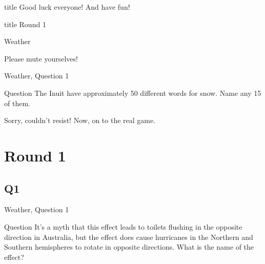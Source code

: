 \documentclass[11pt]{beamer}
\begin{document}
\begingroup{}
\begin{frame}
\vfill{}
\begin{beamercolorbox}[sep=8pt,center,shadow=true,rounded=true]{title}
Good luck everyone! And have fun!
\end{beamercolorbox}
\vfill{}
\end{frame}
\endgroup{}


\begin{frame}
\vfill
\centering
\begin{beamercolorbox}[sep=8pt,center,shadow=true,rounded=true]{title}
Round 1\par%
Weather\par%
\end{beamercolorbox}
\begin{center}
Please mute yourselves!
\end{center}
\vfill
\end{frame}

\begin{frame}[t]{Weather, Question 1}

\begin{block}{Question}
The Inuit have approximately 50 different words for snow. Name any 15 of them.
\end{block}
\pause{}
\begin{block}{}
Sorry, couldn't resist! Now, on to the real game.
\end{block}
\end{frame}
\def\thisSectionName{Weather}
\section{Round 1}
\subsection*{Q1}
\begin{frame}[t]{Weather, Question 1}
\begin{block}{Question}
It's a myth that this effect leads to toilets flushing in the opposite direction in Australia, but the effect does cause hurricanes in the Northern and Southern hemispheres to rotate in opposite directions. What is the name of the effect?
\end{block}
\end{frame}
\end{document}

